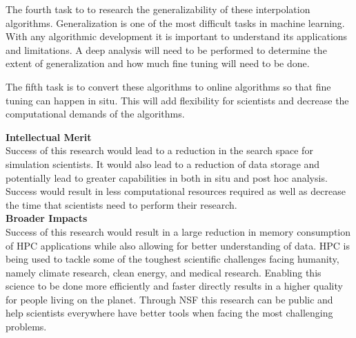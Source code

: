 \documentclass[12pt]{article}
\begin{document}
 The fourth task to to research the generalizability of these
interpolation algorithms. Generalization is one of the most difficult tasks in
machine learning. With any algorithmic development it is important to understand
its applications and limitations. A deep analysis will need to be performed to
determine the extent of generalization and how much fine tuning will need to be
done. 

 The fifth task is to convert these algorithms to online algorithms so
that fine tuning can happen in situ. This will add flexibility for scientists
and decrease the computational demands of the algorithms. 


\textbf{Intellectual Merit}
\\
Success of this research would lead to a reduction in the search space for
simulation scientists. It would also lead to a reduction of data storage and
potentially lead to greater capabilities in both in situ and post hoc analysis. 
Success would result in less computational resources required as well as
decrease the time that scientists need to perform their research. 
%
\\\textbf{Broader Impacts} 
\\
Success of this research would result in a large reduction in memory consumption
of HPC applications while also allowing for better understanding of data. HPC is
being used to tackle some of the toughest scientific challenges facing humanity,
namely climate research, clean energy, and medical research. Enabling this
science to be done more efficiently and faster directly results in a higher
quality for people living on the planet. Through NSF this research can be public
and help scientists everywhere have better tools when facing the most
challenging problems.


\footnotesize


%
%
\end{document}
